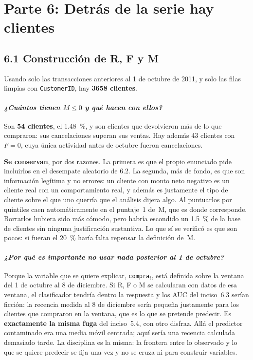 \documentclass[11pt]{article}
\begin{document}
\section{Parte 6: Detr\'as de la serie hay clientes}

\subsection{6.1 Construcci\'on de R, F y M}



Usando solo las transacciones anteriores al 1 de octubre de 2011, y solo las
filas limpias con \texttt{CustomerID}, hay \textbf{\num{3658} clientes}.

\paragraph{{\normalfont\itshape ¿Cu\'antos tienen $M \le 0$ y qu\'e hacen con
ellos?}} Son \textbf{\num{54} clientes}, el \SI{1.48}{\percent}, y son
clientes que devolvieron m\'as de lo que compraron: sus cancelaciones superan
sus ventas. Hay adem\'as \num{43} clientes con $F=0$, cuya \'unica actividad
antes de octubre fueron cancelaciones.

\textbf{Se conservan}, por dos razones. La primera es que el propio enunciado
pide incluirlos en el desempate aleatorio de 6.2. La segunda, m\'as de
fondo, es que son informaci\'on leg\'itima y no errores: un cliente con monto
neto negativo es un cliente real con un comportamiento real, y adem\'as es
justamente el tipo de cliente sobre el que uno querr\'ia que el an\'alisis
dijera algo. Al puntuarlos por quintiles caen autom\'aticamente en el
puntaje~1 de~M, que es donde corresponde. Borrarlos hubiera sido m\'as
c\'omodo, pero habr\'ia escondido un \SI{1.5}{\percent} de la base de
clientes sin ninguna justificaci\'on sustantiva. Lo que s\'i se verific\'o es
que son pocos: si fueran el \SI{20}{\percent} har\'ia falta repensar la
definici\'on de~M.

\paragraph{{\normalfont\itshape ¿Por qu\'e es importante no usar nada
posterior al 1 de octubre?}} Porque la variable que se quiere explicar,
\texttt{compra}$_i$, est\'a definida sobre la ventana del 1 de octubre al 8
de diciembre. Si R, F o M se calcularan con datos de esa ventana, el
clasificador tendr\'ia dentro la respuesta y los AUC del inciso~6.3 ser\'ian
ficci\'on: la recencia medida al 8 de diciembre ser\'ia peque\~na justamente
para los clientes que compraron en la ventana, que es lo que se pretende
predecir. Es \textbf{exactamente la misma fuga} del inciso~5.4, con otro
disfraz. All\'a el predictor contaminado era una media m\'ovil centrada;
aqu\'i ser\'ia una recencia calculada demasiado tarde. La disciplina es la
misma: la frontera entre lo observado y lo que se quiere predecir se fija una
vez y no se cruza ni para construir variables.
\end{document}
